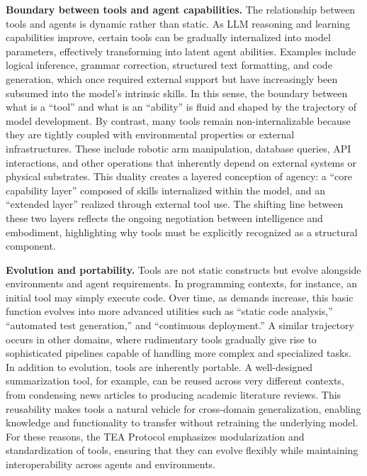 \documentclass[11pt]{article}
\begin{document}
\textbf{Boundary between tools and agent capabilities.}  
The relationship between tools and agents is dynamic rather than static. As LLM reasoning and learning capabilities improve, certain tools can be gradually internalized into model parameters, effectively transforming into latent agent abilities. Examples include logical inference, grammar correction, structured text formatting, and code generation, which once required external support but have increasingly been subsumed into the model’s intrinsic skills. In this sense, the boundary between what is a ``tool'' and what is an ``ability'' is fluid and shaped by the trajectory of model development. By contrast, many tools remain non-internalizable because they are tightly coupled with environmental properties or external infrastructures. These include robotic arm manipulation, database queries, API interactions, and other operations that inherently depend on external systems or physical substrates. This duality creates a layered conception of agency: a ``core capability layer'' composed of skills internalized within the model, and an ``extended layer'' realized through external tool use. The shifting line between these two layers reflects the ongoing negotiation between intelligence and embodiment, highlighting why tools must be explicitly recognized as a structural component.  

\textbf{Evolution and portability.}  
Tools are not static constructs but evolve alongside environments and agent requirements. In programming contexts, for instance, an initial tool may simply execute code. Over time, as demands increase, this basic function evolves into more advanced utilities such as ``static code analysis,'' ``automated test generation,'' and ``continuous deployment.'' A similar trajectory occurs in other domains, where rudimentary tools gradually give rise to sophisticated pipelines capable of handling more complex and specialized tasks. In addition to evolution, tools are inherently portable. A well-designed summarization tool, for example, can be reused across very different contexts, from condensing news articles to producing academic literature reviews. This reusability makes tools a natural vehicle for cross-domain generalization, enabling knowledge and functionality to transfer without retraining the underlying model. For these reasons, the TEA Protocol emphasizes modularization and standardization of tools, ensuring that they can evolve flexibly while maintaining interoperability across agents and environments.  
\end{document}
